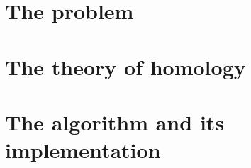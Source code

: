 \documentclass[12pt]{book}
\title{}
\author{Arnau Mas}
\date{}
\begin{document}
\maketitle
\thispagestyle{empty}

\pagestyle{plain}
\frontmatter
\tableofcontents

\mainmatter
\pagestyle{main}

\chapter{The problem}


\chapter{The theory of homology}


\chapter{The algorithm and its implementation}


\backmatter
\printbibliography
\end{document}
